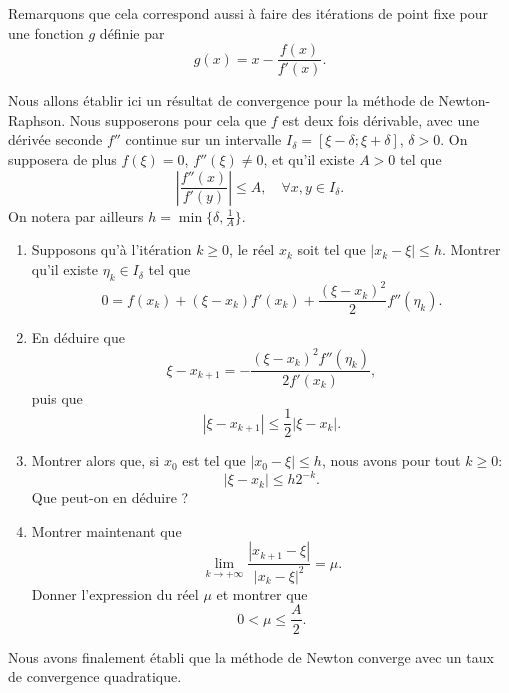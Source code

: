 \medskip

Remarquons que cela correspond aussi à faire des itérations de point fixe pour une fonction $g$ définie par
\[
g(x) = x - \frac{f(x)}{f'(x)}.
\]

\medskip

\begin{exercice}

Nous allons établir ici un résultat de convergence pour la méthode de Newton-Raphson. Nous supposerons pour cela que $f$ est deux fois dérivable, avec une dérivée seconde $f''$ continue sur un intervalle $I_\delta = [ \xi - \delta ; \xi + \delta ]$, $\delta > 0$. On supposera de plus $f(\xi) = 0$, $f''(\xi)\neq0$, et qu'il existe $A >0$ tel que
\begin{equation} \label{eq:A}
\left | \frac{f''(x)}{f'(y)} \right | \leq A, \quad \forall x,y \in I_\delta.
\end{equation}
On notera par ailleurs $h = \min \{ \delta , \frac1{A} \}$.

\begin{enumerate}

\item Supposons qu'à l'itération $k\geq0$, le réel $x_k$ soit tel que $|x_k - \xi| \leq h$. Montrer qu'il existe $\eta_k \in I_\delta$ tel que 
\[
0 = f(x_k) + (\xi - x_k) f'(x_k) + \frac{(\xi-x_k)^2}{2}f''(\eta_k).
\]

\item En déduire que
\[
\xi - x_{k+1} = - \frac{(\xi-x_k)^2 f''(\eta_k)}{2 f'(x_k)},
\]
puis que
\[
| \xi - x_{k+1} | \leq \frac12 | \xi - x_k |.
\]

\item Montrer alors que, si $x_0$ est tel que $|x_0 - \xi|\leq h$, nous avons pour tout $k\geq0$:
\[
| \xi - x_k | \leq h 2^{-k}.
\]
Que peut-on en déduire ?

\item Montrer maintenant que
\[
\lim_{k\rightarrow +\infty} \frac{|x_{k+1} - \xi|}{| x_k - \xi|^2}
= \mu.
\]
Donner l'expression du réel $\mu$ et montrer que
\[
0 < \mu \leq \frac{A}{2}.
\]

\medskip

\end{enumerate}

Nous avons finalement établi que la méthode de Newton converge avec un taux de convergence quadratique.

\end{exercice}

\medskip

